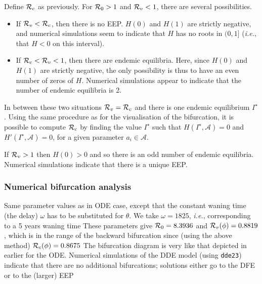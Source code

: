 \documentclass[aspectratio=169]{beamer}\usepackage[]{graphicx}\usepackage[]{xcolor}
\begin{document}
\begin{frame}
Define $\mathcal{R}_c$ as previously. For $\mathcal{R}_0>1$ and
$\mathcal{R}_v<1$, there are several possibilities.
\begin{itemize}
\item If $\mathcal{R}_v<\mathcal{R}_c$, then there is no EEP. $H(0)$ and $H(1)$
 are strictly negative, and numerical simulations seem to indicate
 that $H$ has no roots in $(0,1]$ (\emph{i.e.}, that $H<0$ on this
 interval).
\item If $\mathcal{R}_c<\mathcal{R}_v<1$, then there are endemic equilibria.
 Here, since $H(0)$
 and $H(1)$ are strictly negative, the only possibility is thus to
 have an even number of zeros of $H$. Numerical simulations appear to
 indicate that the number of endemic equilibria is 2.
\end{itemize}
In between these two situations $\mathcal{R}_v=\mathcal{R}_c$ and there is
one endemic equilibrium $I^\star$. Using the same procedure as for the
visualisation of the bifurcation, it is possible to compute
$\mathcal{R}_c$ by finding the value $I^\star$ such that
$H(I^\star,\mathcal{A})=0$ and $H'(I^\star,\mathcal{A})=0$, for a given
parameter $a_i\in\mathcal{A}$.

If $\mathcal{R}_v>1$ then $H(0)>0$ and so there is an odd number of endemic
equilibria. Numerical simulations indicate that there is a unique
EEP.
\end{frame}

\begin{frame}\frametitle{Numerical bifurcation analysis}
Same parameter values as in ODE case, except that the
constant waning time
(the delay) $\omega$ has to be substituted for $\theta$. We take
$\omega=1825$, \emph{i.e.}, corresponding to a 5 years waning time
\vfill
These parameters give $\mathcal{R}_0=8.3936$ and $\mathcal{R}_v(\phi)=0.8819$, which
is in the range of the backward bifurcation since (using the above
method) $\mathcal{R}_c(\phi)=0.8675$
\vfill
The bifurcation diagram is very like that depicted in
earlier for the ODE. Numerical simulations of the DDE model
(using {\tt dde23}) indicate that there are no additional
bifurcations; solutions either go to the DFE or to the (larger) EEP
\end{frame}
\end{document}
